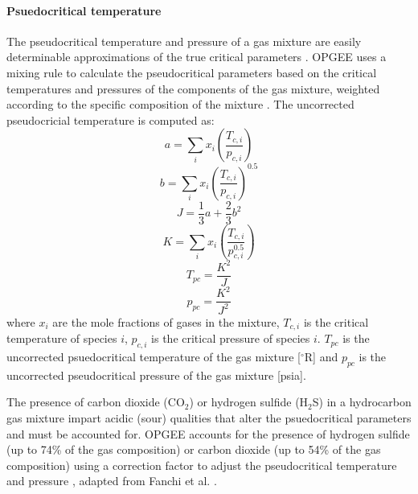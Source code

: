 \documentclass[11pt]{report}
\begin{document}
\paragraph{Psuedocritical temperature}

The pseudocritical temperature and pressure of a gas mixture are easily determinable approximations of the true critical parameters \cite[p. 111]{Mccain1990}. OPGEE uses a mixing rule to calculate the pseudocritical parameters based on the critical temperatures and pressures of the components of the gas mixture, weighted according to the specific composition of the mixture \cite{StewartBurkhardtVoo1959}. The uncorrected pseudocricial temperature is computed as:
\begin{equation}
a = \sum_i x_i \left( \frac{T_{c,i}}{p_{c,i}} \right)
\end{equation}
\begin{equation}
b = \sum_i x_i \left(\frac{T_{c,i}}{p_{c,i}} \right)^{0.5}
\end{equation}
\begin{equation}
J = \frac{1}{3}a + \frac{2}{3}b^2
\end{equation}
\begin{equation}
K = \sum_i x_i \left( \frac{T_{c,i}}{p_{c,i}^{0.5}}  \right)
\end{equation}
\begin{equation}\label{eq:Tpc}
T_{pc} = \frac{K^2}{J}
\end{equation}
\begin{equation}\label{eq:Ppc}
p_{pc} = \frac{K^2}{J^2}
\end{equation}
where $x_i$ are the mole fractions of gases in the mixture, $T_{c,i}$ is the critical temperature of species $i$, $p_{c,i}$ is the critical pressure of species $i$.  $T_{pc}$ is the uncorrected psuedocritical temperature of the gas mixture [$^\circ$R] and $p_{pc}$ is the uncorrected pseudocritical pressure of the gas mixture [psia].

The presence of carbon dioxide (CO$_2$) or hydrogen sulfide (H$_2$S) in a hydrocarbon gas mixture impart acidic (sour) qualities that alter the psuedocritical parameters and must be accounted for. OPGEE accounts for the presence of hydrogen sulfide (up to 74\% of the gas composition) or carbon dioxide (up to 54\% of the gas composition) using a correction factor to adjust the pseudocritical temperature and pressure \cite{WichertAziz1972}, adapted from Fanchi et al. \cite[p. 229]{Fanchi2007}. 
\end{document}
